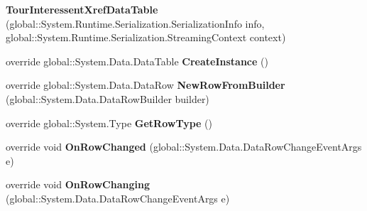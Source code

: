 \begin{DoxyCompactItemize}
\item 
{\bfseries Tour\+Interessent\+Xref\+Data\+Table} (global\+::\+System.\+Runtime.\+Serialization.\+Serialization\+Info info, global\+::\+System.\+Runtime.\+Serialization.\+Streaming\+Context context)\hypertarget{class_products_1_1_data_1_1ds_sage_1_1_tour_interessent_xref_data_table_a3bab7b88bfbe5e28eced85bfd56e547b}{}\label{class_products_1_1_data_1_1ds_sage_1_1_tour_interessent_xref_data_table_a3bab7b88bfbe5e28eced85bfd56e547b}

\item 
override global\+::\+System.\+Data.\+Data\+Table {\bfseries Create\+Instance} ()\hypertarget{class_products_1_1_data_1_1ds_sage_1_1_tour_interessent_xref_data_table_a41e394d4c4190992bef1876ee7f3f46f}{}\label{class_products_1_1_data_1_1ds_sage_1_1_tour_interessent_xref_data_table_a41e394d4c4190992bef1876ee7f3f46f}

\item 
override global\+::\+System.\+Data.\+Data\+Row {\bfseries New\+Row\+From\+Builder} (global\+::\+System.\+Data.\+Data\+Row\+Builder builder)\hypertarget{class_products_1_1_data_1_1ds_sage_1_1_tour_interessent_xref_data_table_aa12963dca4391fd55a2e82ecd894c10d}{}\label{class_products_1_1_data_1_1ds_sage_1_1_tour_interessent_xref_data_table_aa12963dca4391fd55a2e82ecd894c10d}

\item 
override global\+::\+System.\+Type {\bfseries Get\+Row\+Type} ()\hypertarget{class_products_1_1_data_1_1ds_sage_1_1_tour_interessent_xref_data_table_a6641aa8839ab886712c89b0a04165819}{}\label{class_products_1_1_data_1_1ds_sage_1_1_tour_interessent_xref_data_table_a6641aa8839ab886712c89b0a04165819}

\item 
override void {\bfseries On\+Row\+Changed} (global\+::\+System.\+Data.\+Data\+Row\+Change\+Event\+Args e)\hypertarget{class_products_1_1_data_1_1ds_sage_1_1_tour_interessent_xref_data_table_af785028333c33a9e484425e6d61b7dbf}{}\label{class_products_1_1_data_1_1ds_sage_1_1_tour_interessent_xref_data_table_af785028333c33a9e484425e6d61b7dbf}

\item 
override void {\bfseries On\+Row\+Changing} (global\+::\+System.\+Data.\+Data\+Row\+Change\+Event\+Args e)\hypertarget{class_products_1_1_data_1_1ds_sage_1_1_tour_interessent_xref_data_table_a18a2dbfb672ffc4d7bc50c7ba01ff7c5}{}\label{class_products_1_1_data_1_1ds_sage_1_1_tour_interessent_xref_data_table_a18a2dbfb672ffc4d7bc50c7ba01ff7c5}


\end{DoxyCompactItemize}
